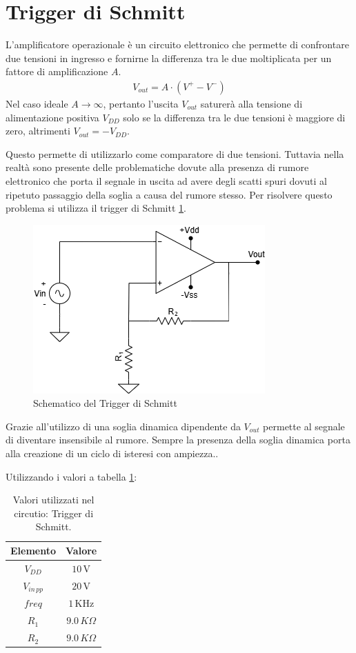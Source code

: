 \documentclass[a4paper,12pt]{article}
\begin{document}


\section*{Trigger di Schmitt} 
L'amplificatore operazionale è un circuito elettronico che permette di confrontare due tensioni in ingresso e fornirne la differenza tra le due moltiplicata per un fattore di amplificazione $A$.
\begin{align*}
    V_{out} = A \cdot (V^+ - V^-)
\end{align*} 
Nel caso ideale $ A \rightarrow \infty $, pertanto l'uscita $V_{out}$ saturerà alla tensione di alimentazione positiva $V_{DD}$ solo se la differenza tra le due tensioni è maggiore di zero, altrimenti $V_{out} = -V_{DD}$.

Questo permette di utilizzarlo come comparatore di due tensioni. Tuttavia nella realtà sono presente delle problematiche dovute alla presenza di rumore elettronico che porta il segnale in uscita ad avere degli scatti spuri dovuti al ripetuto passaggio della soglia a causa del rumore stesso.
Per risolvere questo problema si utilizza il trigger di Schmitt \ref{fig:trigger_schmitt}.

\begin{figure}[h]
    \centering
    \includegraphics[width = 0.4\linewidth]{./immagini/schmitt/circuito.png}
    \caption{Schematico del Trigger di Schmitt}
    \label{fig:trigger_schmitt}
\end{figure}

Grazie all'utilizzo di una soglia dinamica dipendente da $V_{out}$ permette al segnale di diventare insensibile al rumore. 
Sempre la presenza della soglia dinamica porta alla creazione di un ciclo di isteresi con ampiezza..

Utilizzando i valori a tabella \ref{tab:valori_trigger_schmitt}:
\begin{table}[h]
    \centering
    \setlength{\tabcolsep}{20pt}
    \begin{tabular}{c c}
        \toprule
        Elemento        & Valore            \\
        \midrule
        $V_{DD}$        & $10\,\mathrm{V}$  \\
        $V_{in\,pp}$    & $20\,\mathrm{V}$  \\
        $freq$             & $1\,\mathrm{KHz}$ \\
        $R_1$           & $9.0\,K\Omega$      \\
        $R_2$           & $9.0\,K\Omega$      \\
        \bottomrule
    \end{tabular}
    \caption{Valori utilizzati nel circutio: Trigger di Schmitt.}
    \label{tab:valori_trigger_schmitt}
\end{table}
\end{document}
